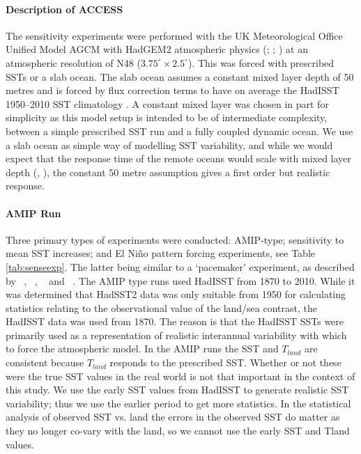 \paragraph{Description of ACCESS}
The sensitivity experiments were performed with the UK Meteorological Office 
Unified Model AGCM with HadGEM2 atmospheric physics (\citet{Davies2005}; 
\citet{Martin2010}; \citet{Bellouin2011}) at an atmospheric resolution of N48 
($3.75^{\circ} \times 
2.5^{\circ}$). This was forced with prescribed SSTs or a slab ocean. The slab
ocean assumes a constant mixed layer depth of 50 metres and is forced by flux 
correction terms to have on average the HadISST 1950--2010 SST climatology 
\citep{Wang2014}. A constant mixed layer was chosen in part for simplicity as 
this model setup is intended to be of intermediate complexity, between a simple 
prescribed SST run and a fully coupled dynamic ocean. We use a slab ocean as 
simple way of modelling SST variability, and while we would expect that the 
response time of the remote oceans would scale with mixed layer depth 
(\citealt{Su2005a}, \citealt{Lintner2007}), the constant 
50 metre assumption gives a first order but realistic response.

\paragraph{AMIP Run}
Three primary types of experiments were conducted: AMIP-type; sensitivity to 
mean SST increases; and El Ni{\~n}o pattern forcing experiments, see Table 
\ref{tab:senseexp}. The latter being similar to a `pacemaker' experiment, as 
described by ~\citealt{Alexander1992}, ~\citealt{Alexander1992a}, 
~\citealt{Lau2000} and ~\citealt{Lu2011}. The AMIP type runs used HadISST from 
1870 to 2010. While it was determined that HadSST2 data was only suitable
from 1950 for calculating statistics relating to the observational value of the 
land/sea contrast, the HadISST data was used from 1870. The reason is that the 
HadISST SSTs were primarily used as a representation of realistic interannual 
variability with which to force the atmospheric model.  In the AMIP runs the SST 
and $T_{land}$ are consistent because $T_{land}$ responds to the prescribed SST.  
Whether or not these were the true SST values in the real world is not that 
important in the context of this study.  We use the early SST values from 
HadISST to generate realistic SST variability; thus we use the earlier period to 
get more statistics. In the statistical analysis of observed SST vs. land the 
errors in the observed SST do matter as they no longer co-vary with the land, so 
we cannot use the early SST and Tland values. 

